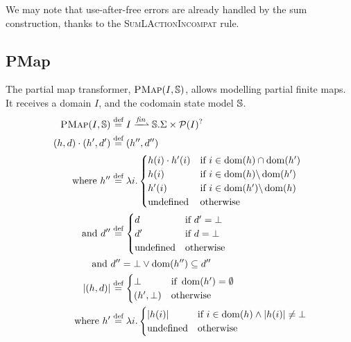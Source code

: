 
We may note that use-after-free errors are already handled by the sum construction, thanks to the \textsc{SumLActionIncompat} rule.

\subsection{PMap}

The partial map transformer, $\textsc{PMap}(I,\mathbb S)$, allows modelling partial finite maps. It receives a domain $I$, and the codomain state model $\mathbb S$.
\begin{align*}
	\PMap(I,\mmdl) &\defeq I \finmap \mmdl.\Sigma \times \pset(I)^?\\
	(h,d)\cdot (h',d') &\defeq (h'', d'') \\
	\text{where } h''&\defeq \lambda i.\begin{cases}
		h(i)\cdot h'(i)&\If~i\in \dom(h)\cap\dom(h')\\
		h(i) &\If~i\in \dom(h) \backslash \dom(h')\\
		h'(i) &\If~i\in \dom(h') \backslash \dom(h)\\
		\text{undefined}&\Otherwise
	\end{cases}\\
	\text{and }d''&\defeq\begin{cases}
		d&\If~d'=\bot\\
		d'&\If~d=\bot\\
		\text{undefined}&\Otherwise
	\end{cases}\\
	\text{and }& d'' = \bot \lor \dom(h'')\subseteq d''\\
	|(h, d)| &\defeq \begin{cases}
		\bot &\If~\dom(h')=\emptyset\\
		(h', \bot) &\Otherwise
	\end{cases}\\
	\text{where }h'&\defeq \lambda i.\begin{cases}
		|h(i)| &\If~ i\in\dom(h) \land |h(i)| \neq \bot\\
		\text{undefined} &\Otherwise
	\end{cases}
\end{align*}

